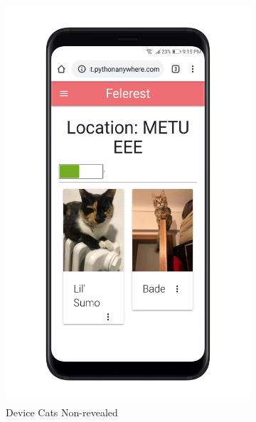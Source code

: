 \begin{figure}[ht]

\begin{subfigure}{0.5\textwidth}
    \centering
    \includegraphics[width=\linewidth]{content/030_system_architecture/img/user_interface/cats.jpeg}
    \caption{Device Cats Non-revealed}
    \label{fig:ui-cats}
\end{subfigure}
\begin{subfigure}{0.5\textwidth}
    \centering

\end{subfigure}
\end{figure}
